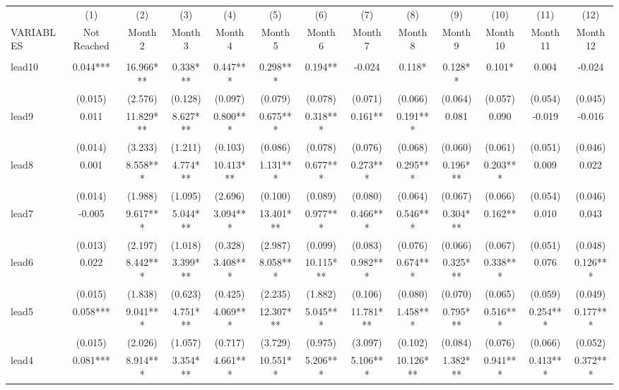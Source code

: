 \begin{tabular}{lcccccccccccc} \hline
 & (1) & (2) & (3) & (4) & (5) & (6) & (7) & (8) & (9) & (10) & (11) & (12) \\
VARIABLES & Not Reached & Month 2 & Month 3 & Month 4 & Month 5 & Month 6 & Month 7 & Month 8 & Month 9 & Month 10 & Month 11 & Month 12 \\ \hline
 &  &  &  &  &  &  &  &  &  &  &  &  \\
lead10 & 0.044*** & 16.966*** & 0.338*** & 0.447*** & 0.298*** & 0.194** & -0.024 & 0.118* & 0.128** & 0.101* & 0.004 & -0.024 \\
 & (0.015) & (2.576) & (0.128) & (0.097) & (0.079) & (0.078) & (0.071) & (0.066) & (0.064) & (0.057) & (0.054) & (0.045) \\
lead9 & 0.011 & 11.829*** & 8.627*** & 0.800*** & 0.675*** & 0.318*** & 0.161** & 0.191*** & 0.081 & 0.090 & -0.019 & -0.016 \\
 & (0.014) & (3.233) & (1.211) & (0.103) & (0.086) & (0.078) & (0.076) & (0.068) & (0.060) & (0.061) & (0.051) & (0.046) \\
lead8 & 0.001 & 8.558*** & 4.774*** & 10.413*** & 1.131*** & 0.677*** & 0.273*** & 0.295*** & 0.196*** & 0.203*** & 0.009 & 0.022 \\
 & (0.014) & (1.988) & (1.095) & (2.696) & (0.100) & (0.089) & (0.080) & (0.064) & (0.067) & (0.066) & (0.054) & (0.046) \\
lead7 & -0.005 & 9.617*** & 5.044*** & 3.094*** & 13.401*** & 0.977*** & 0.466*** & 0.546*** & 0.304*** & 0.162** & 0.010 & 0.043 \\
 & (0.013) & (2.197) & (1.018) & (0.328) & (2.987) & (0.099) & (0.083) & (0.076) & (0.066) & (0.067) & (0.051) & (0.048) \\
lead6 & 0.022 & 8.442*** & 3.399*** & 3.408*** & 8.058*** & 10.115*** & 0.982*** & 0.674*** & 0.325*** & 0.338*** & 0.076 & 0.126*** \\
 & (0.015) & (1.838) & (0.623) & (0.425) & (2.235) & (1.882) & (0.106) & (0.080) & (0.070) & (0.065) & (0.059) & (0.049) \\
lead5 & 0.058*** & 9.041*** & 4.751*** & 4.069*** & 12.307*** & 5.045*** & 11.781*** & 1.458*** & 0.795*** & 0.516*** & 0.254*** & 0.177*** \\
 & (0.015) & (2.026) & (1.057) & (0.717) & (3.729) & (0.975) & (3.097) & (0.102) & (0.084) & (0.076) & (0.066) & (0.052) \\
lead4 & 0.081*** & 8.914*** & 3.354*** & 4.661*** & 10.551** & 5.206*** & 5.106*** & 10.126*** & 1.382*** & 0.941*** & 0.413*** & 0.372*** \\

\end{tabular}
